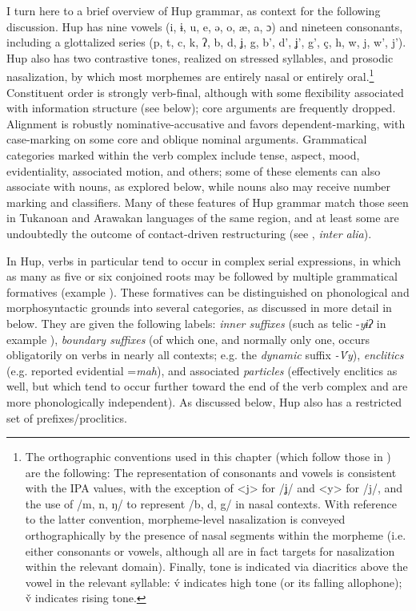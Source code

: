\documentclass[output=paper]{langscibook}
\begin{document}
I turn here to a brief overview of Hup grammar, as context for the following discussion. Hup has nine vowels (i, ɨ, u, e, ǝ, o, æ, a, ɔ) and nineteen consonants, including a glottalized  series (p, t, c, k, ʔ, b, d, ʝ, g, b', d', ʝ', g', ç, h, w, j, w', j'). Hup also has two contrastive tones, realized on stressed syllables, and prosodic nasalization, by which most morphemes are entirely nasal or entirely oral.\footnote{The orthographic conventions used in this chapter (which follow those in \citealt{Epps2008}) are the following: The representation of consonants and vowels is consistent with the IPA values, with the exception of <j> for /ʝ/ and <y> for /j/, and the use of /m, n, ŋ/ to represent /b, d, g/ in nasal contexts. With reference to the latter convention, morpheme-level nasalization is conveyed orthographically by the presence of nasal segments within the morpheme (i.e. either consonants or vowels, although all are in fact targets for nasalization within the relevant domain). Finally, tone is indicated via diacritics above the vowel in the relevant syllable: \'{v} indicates high tone (or its falling allophone); \v{v} indicates rising tone.}  Constituent order is strongly verb-final, although with some flexibility associated with information structure (see  below); core arguments are frequently dropped. Alignment is robustly nominative-accusative and favors dependent-marking, with case-marking on some core and oblique nominal arguments. Grammatical categories marked within the verb complex include tense, aspect, mood, evidentiality, associated motion, and others; some of these elements can also associate with nouns, as explored below, while nouns also may receive number marking and classifiers. Many of these features of Hup grammar match those seen in Tukanoan and Arawakan languages of the same region, and at least some are undoubtedly the outcome of contact-driven restructuring (see \citealt{Epps2007,Epps2008c}, \textit{inter alia}).

In Hup, verbs in particular tend to occur in complex serial expressions, in which as many as five or six conjoined roots may be followed by multiple grammatical formatives (example ). These formatives can be distinguished on phonological and morphosyntactic grounds into several categories, as discussed in more detail in  below. They are given the following labels: \textit{inner suffixes} (such as telic -\textit{yɨʔ} in example ), \textit{boundary suffixes} (of which one, and normally only one, occurs obligatorily on verbs in nearly all contexts; e.g. the \textit{dynamic} suffix \textit{{}-\'{V}y}), \textit{enclitics} (e.g. reported evidential =\textit{mah}), and associated \textit{particles} (effectively enclitics as well, but which tend to occur further toward the end of the verb complex and are more phonologically independent). As discussed below, Hup also has a restricted set of prefixes/proclitics.
\end{document}
